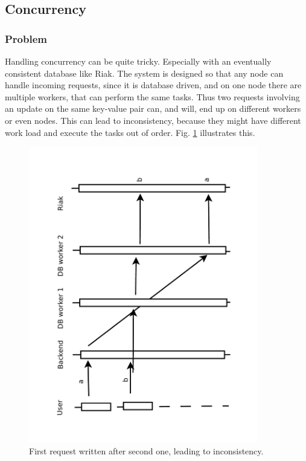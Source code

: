 \documentclass[11pt,a4paper]{report}
\begin{document}
\subsection{Concurrency}
\label{sec:concurrency}
\subsubsection{Problem}
Handling concurrency can be quite tricky.
Especially with an eventually consistent database like Riak.
The system is designed so that any node can handle incoming requests,
since it is database driven, and on one node there are multiple workers,
that can perform the same tasks.
Thus two requests involving an update on the same key-value pair can, and will,
end up on different workers or even nodes.
This can lead to inconsistency, because they might have different work load
and execute the tasks out of order.
Fig. \ref{fig:concurrency:problem_expl} illustrates this.
\begin{figure}[htbp!]
 \centering
 \includegraphics[width=10cm, angle=-90]{./graphics/Concurrency_-_Earlier_session_write_replace_later_session_write.pdf}
 \vspace{-1cm}
 \caption{First request written after second one, leading to inconsistency.}
 \label{fig:concurrency:problem_expl}
\end{figure}
\end{document}
